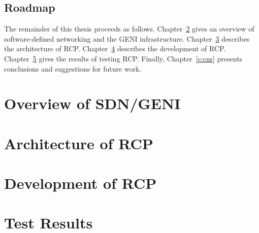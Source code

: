 \documentclass[letterpaper]{../kuthesis/kuthesis}
\begin{document}
\section{Roadmap}
The remainder of this thesis proceeds as follows. 
Chapter~\ref{c:overview} gives an overview of software-defined networking 
and the GENI infrastructure.
Chapter~\ref{c:architecture} describes the architecture of RCP. 
Chapter~\ref{c:development} describes the development of RCP.
Chapter~\ref{c:results} gives the results of testing RCP.
Finally, Chapter~\ref{c:cnr} presents conclusions and suggestions for future work.

\chapter{Overview of SDN/GENI} \label{c:overview}

\chapter{Architecture of RCP} \label{c:architecture}

\chapter{Development of RCP} \label{c:development}

\chapter{Test Results} \label{c:results}
\end{document}
